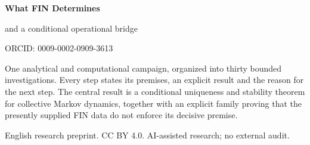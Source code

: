 \documentclass[11pt,a4paper]{article}
\begin{document}
\hypersetup{pageanchor=false}
\begin{titlepage}\centering\vspace*{18mm}
{\Huge\bfseries What FIN Determines\par}
\vspace{3mm}{\Huge\bfseries and What It Does Not\par}
\vspace{10mm}{\LARGE Thirty Adaptive Falsification Studies\par}
\vspace{5mm}{\Large Signed kernels, dual dynamics, collective information,\par}
{\Large and a conditional operational bridge\par}
\vspace{12mm}{\Large Programmes ST8549--ST8578\par}
\vspace{10mm}{\Large Krzysztof \.Zuchowski\par}
\vspace{3mm}{Independent Researcher --- Fractal Information Theory Project\par}
{ORCID: 0009-0002-0909-3613\par}
\vspace{9mm}{6 September 2026\par}
\vfill
\begin{minipage}{.89\textwidth}
One analytical and computational campaign, organized into thirty bounded
investigations. Every step states its premises, an explicit result and the
reason for the next step. The central result is a conditional uniqueness
and stability theorem for collective Markov dynamics, together with an
explicit family proving that the presently supplied FIN data do not enforce
its decisive premise.
\end{minipage}
\vfill{\small English research preprint. CC BY 4.0. AI-assisted research; no external audit.}
\end{titlepage}\hypersetup{pageanchor=true}
\end{document}
